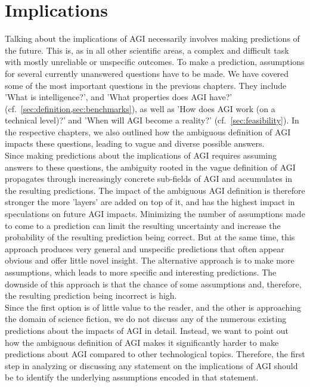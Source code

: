 \section{Implications}\label{sec:implications}
Talking about the implications of AGI necessarily involves making predictions of the future.
This is, as in all other scientific areas, a complex and difficult task with mostly unreliable or unspecific outcomes.
To make a prediction, assumptions for several currently unanswered questions have to be made.
We have covered some of the most important questions in the previous chapters.
They include 'What is intelligence?', and 'What properties does AGI have?' (cf.~\cref{sec:definition,sec:benchmarks}), as well as 'How does AGI work (on a technical level)?' and 'When will AGI become a reality?' (cf.~\cref{sec:feasibility}).
In the respective chapters, we also outlined how the ambiguous definition of AGI impacts these questions, leading to vague and diverse possible answers.\\

Since making predictions about the implications of AGI requires assuming answers to these questions, the ambiguity rooted in the vague definition of AGI propagates through increasingly concrete sub-fields of AGI and accumulates in the resulting predictions.
The impact of the ambiguous AGI definition is therefore stronger the more 'layers' are added on top of it, and has the highest impact in speculations on future AGI impacts.
Minimizing the number of assumptions made to come to a prediction can limit the resulting uncertainty and increase the probability of the resulting prediction being correct.
But at the same time, this approach produces very general and unspecific predictions that often appear obvious and offer little novel insight.
The alternative approach is to make more assumptions, which leads to more specific and interesting predictions.
The downside of this approach is that the chance of some assumptions and, therefore, the resulting prediction being incorrect is high.\\

Since the first option is of little value to the reader, and the other is approaching the domain of science fiction, we do not discuss any of the numerous existing predictions about the impacts of AGI in detail.
Instead, we want to point out how the ambiguous definition of AGI makes it significantly harder to make predictions about AGI compared to other technological topics.
Therefore, the first step in analyzing or discussing any statement on the implications of AGI should be to identify the underlying assumptions encoded in that statement.

